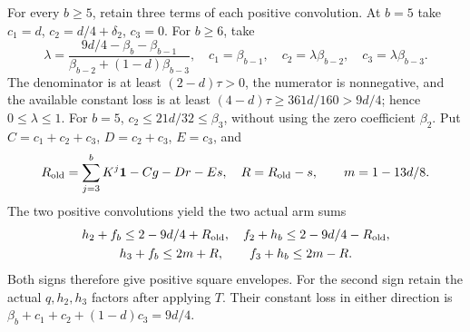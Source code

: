 For every \(b\ge5\), retain three terms of each positive convolution.
At \(b=5\) take \(c_1=d\), \(c_2=d/4+\delta_2\), \(c_3=0\).
For \(b\ge6\), take
\begin{equation}\label{eq:unit-ordinary:three-retained}
 \lambda=\frac{9d/4-\beta_b-\beta_{b-1}}
                 {\beta_{b-2}+(1-d)\beta_{b-3}},\quad
 c_1=\beta_{b-1},\quad c_2=\lambda\beta_{b-2},\quad
 c_3=\lambda\beta_{b-3}.
\end{equation}
The denominator is at least \((2-d)\tau>0\), the numerator is
nonnegative, and the available constant loss is at least
\((4-d)\tau\ge361d/160>9d/4\); hence \(0\le\lambda\le1\).
For \(b=5\), \(c_2\le21d/32\le\beta_3\), without using
the zero coefficient \(\beta_2\).
Put \(C=c_1+c_2+c_3\), \(D=c_2+c_3\), \(E=c_3\), and
\[
 R_{\rm old}=\sum_{j=3}^bK^j\mathbf1-Cg-Dr-Es,\quad
 R=R_{\rm old}-s,\qquad m=1-13d/8.
\]
The two positive convolutions yield the two actual arm sums
\begin{equation}\label{eq:unit-ordinary:three-arm-sums}
 \begin{gathered}
 h_2+f_b\le2-9d/4+R_{\rm old},\quad
 f_2+h_b\le2-9d/4-R_{\rm old},\\
 h_3+f_b\le2m+R,\qquad f_3+h_b\le2m-R.
 \end{gathered}
\end{equation}
Both signs therefore give positive square envelopes. For the second
sign retain the actual \(q,h_2,h_3\) factors after applying \(T\).
Their constant loss in either direction is
\(\beta_b+c_1+c_2+(1-d)c_3=9d/4\).

